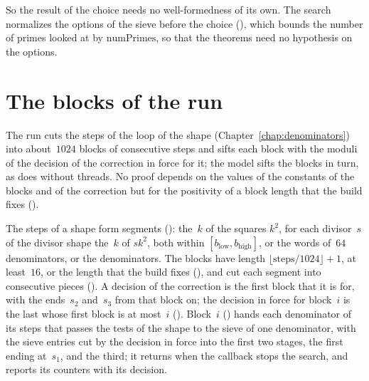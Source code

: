 So the result of the choice needs no well-formedness of its own. The search normalizes the options
of the sieve before the choice (), which bounds the number
of primes looked at by $\mathrm{numPrimes}$, so that the theorems need no hypothesis on the options.

\section{The blocks of the run}\label{sec:moduliBlocks}

The run cuts the steps of the loop of the shape (Chapter~\ref{chap:denominators}) into about~$1024$
blocks of consecutive steps and sifts each block with the moduli of the decision of the correction
in force for it; the model sifts the blocks in turn, as \ratpoints{} does without threads. No proof
depends on the values of the constants of the blocks and of the correction but for the positivity
of a block length that the build fixes ().

\begin{definition}\label{def:blocks}
  \leanok
  The steps of a shape form segments (): the~$k$ of the squares
  $k^2$, for each divisor~$s$ of the divisor shape the~$k$ of $s k^2$, both within
  $[b_{\mathrm{low}}, b_{\mathrm{high}}]$, or the words of~$64$ denominators, or the denominators.
  The blocks have length
  $\lfloor \mathrm{steps}/1024 \rfloor + 1$, at least~$16$, or the length that the build fixes
  (), and cut each segment into consecutive pieces
  (). A decision of the correction is the first block that it is
  for, with the ends~$s_2$ and~$s_3$ from that block on; the decision in force for block~$i$ is the
  last whose first block is at most~$i$ (). Block~$i$
  () hands each denominator of its steps that passes the tests
  of the shape to the sieve of one denominator, with the sieve entries cut by the decision in force
  into the first two stages, the first ending at~$s_1$, and the third; it returns when the callback
  stops the search, and reports its counters with its decision.
\end{definition}

